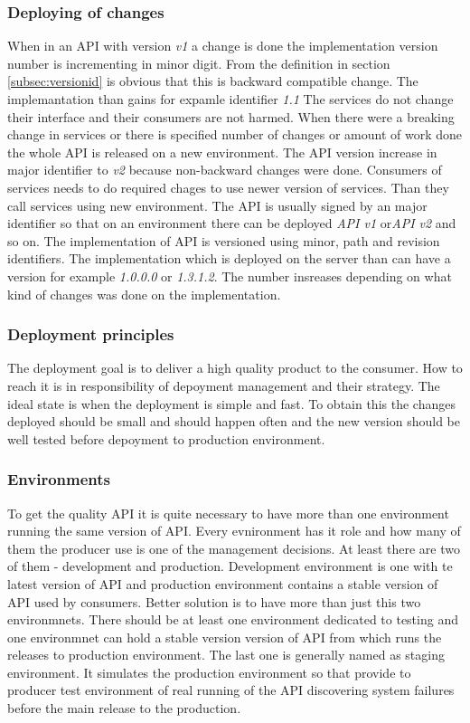 \subsubsection{Deploying of changes}
When in an API with version \emph{v1} a change is done the implementation version number is incrementing in minor digit. From the definition in section \ref{subsec:versionid} is obvious that this is backward compatible change. The implemantation than gains for expamle identifier \emph{1.1} The services do not change their interface and their consumers are not harmed. 
When there were a breaking change in services or there is specified number of changes or amount of work done the whole API is released on a new environment. The API version increase in major identifier to \emph{v2} because non-backward changes were done. Consumers of services needs to do required chages to use newer version of services. Than they call services using new environment. 
The API is usually signed by an major identifier so that on an environment there can be deployed \emph{API v1} or\emph{API v2} and so on.
The implementation of API is versioned using minor, path and revision identifiers. The implementation which is deployed on the server than can have a version for example \emph{1.0.0.0} or \emph{1.3.1.2}. The number insreases depending on what kind of changes was done on the implementation.

\subsubsection{Deployment principles}
The deployment goal is to deliver a high quality product to the consumer. How to reach it is in responsibility of depoyment management and their strategy. The ideal state is when the deployment is simple and fast. To obtain this the changes deployed should be small and should happen often and the new version should be well tested before depoyment to production environment.

\subsubsection{Environments}
To get the quality API it is quite necessary to have more than one environment running the same version of API. Every evnironment has it role and how many of them the producer use is one of the management decisions. At least there are two of them - development and production. Development environment is one with te latest version of API and production environment contains a stable version of API used by consumers.
Better solution is to have more than just this two environmnets. There should be at least one environment dedicated to testing and one environmnet can hold a stable version version of API from which runs the releases to production environment. The last one is generally named as staging environment. It simulates the production environment so that provide to producer test environment of real running of the API discovering system failures before the main release to the production.

